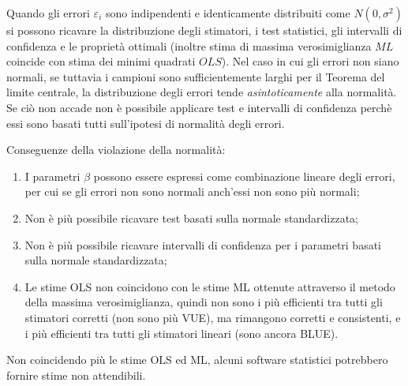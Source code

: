 \documentclass[a4page, 11pt]{article} %
\begin{document}
Quando gli errori $\varepsilon_i$ sono indipendenti e identicamente distribuiti come $N(0,\sigma^{2})$ si possono ricavare la distribuzione degli stimatori, i test statistici, gli intervalli di confidenza e le proprietà ottimali (inoltre stima di massima verosimiglianza $ML$ coincide con stima dei minimi quadrati $OLS$). 
Nel caso in cui gli errori non siano normali, se tuttavia i campioni sono sufficientemente larghi per il Teorema del limite centrale, la distribuzione degli errori tende \textit{asintoticamente} alla normalità. Se ciò non accade non è possibile applicare test e intervalli di confidenza perchè essi sono basati tutti sull’ipotesi di normalità degli errori.

Conseguenze della violazione della normalità:
\begin{enumerate}[noitemsep]
\item I parametri $\beta$ possono essere espressi come combinazione lineare degli errori, per cui se gli errori non sono normali anch’essi non sono più normali;
\item Non è più possibile ricavare test basati sulla normale standardizzata;
\item Non è più possibile ricavare intervalli di confidenza per i parametri basati sulla normale standardizzata;
\item Le stime OLS non coincidono con le stime ML ottenute attraverso il metodo della massima verosimiglianza, quindi non sono i più efficienti tra tutti gli stimatori corretti (non sono più VUE), ma rimangono corretti e consistenti, e i più efficienti tra tutti gli stimatori lineari (sono ancora BLUE).
\end{enumerate}
Non coincidendo più le stime OLS ed ML, alcuni software statistici potrebbero fornire stime non attendibili.
\end{document}
